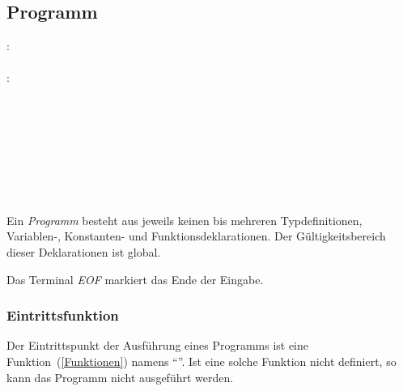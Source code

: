 \subsection{Programm}\label{Programm}
:\label{programm}\\
\hspace*{1cm} \Gspace{} \\
:\label{programm_statements}\\
\hspace*{1cm} \\
\hspace*{1cm} \Gspace{} \\
\hspace*{1cm} \Gspace\Gt{;}\\
\hspace*{1cm} \Gspace\Gt{;}\Gspace{} \\
\hspace*{1cm} \Gspace\Gt{;}\\
\hspace*{1cm} \Gspace\Gt{;}\Gspace{} \\
\hspace*{1cm} \Gspace\Gt{;}\\
\hspace*{1cm} \Gspace\Gt{;}\Gspace{} \\


Ein \emph{Programm} besteht aus jeweils keinen bis mehreren Typdefinitionen, Variablen-, Konstanten- und Funktionsdeklarationen.
Der Gültigkeitsbereich dieser Deklarationen ist global.

\label{EOF} Das Terminal \emph{EOF} markiert das Ende der Eingabe.


\subsubsection{{Eintrittsfunktion}}\label{__Eintrittsfunktion__}
Der Eintrittspunkt der Ausführung eines Programms ist eine Funktion~(\ref{Funktionen}) namens "`"'. Ist eine solche Funktion nicht definiert, so
kann das Programm nicht ausgeführt werden.

